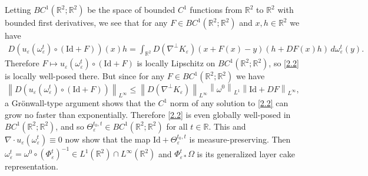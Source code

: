 \documentclass[reqno,centertags,12pt]{amsart}
\theoremstyle{definition}
\numberwithin{equation}{section}
\newcommand{\norm}[1]{\left\|#1\right\|}
\newcommand{\bbR}{{\mathbb{R}}}
\newcommand{\eps}{\varepsilon}
\begin{document}
Letting $BC^{1}(\bbR^{2};\bbR^{2})$ be the space of bounded $C^{1}$ functions from $\bbR^{2}$ to $\bbR^{2}$ with bounded first derivatives, we see that for any $F\in BC^{1}(\bbR^{2};\bbR^{2})$ and $x,h\in\bbR^{2}$ we have
\begin{align*}
    D(u_{\eps}(\omega_{\eps}^{t})\circ(\mathrm{Id} + F))(x)h
    = \int_{\bbR^{2}}D(\nabla^{\perp}K_{\eps})(x + F(x) - y)(h + DF(x)h)
    \,d\omega_{\eps}^{t}(y).
\end{align*}
Therefore
$F\mapsto u_{\eps}(\omega_{\eps}^{t})\circ(\mathrm{Id} + F)$
is locally Lipschitz on $BC^{1}(\bbR^{2};\bbR^{2})$, so
\eqref{2.2} is locally well-posed there.
But since for any $F\in BC^{1}(\bbR^{2};\bbR^{2})$ we have
\[
    \norm{D(u_{\eps}(\omega_{\eps}^{t})\circ(\mathrm{Id} + F))}_{L^{\infty}}
    \leq \norm{D(\nabla^{\perp}K_{\eps})}_{L^{\infty}}\norm{\omega^{0}}_{L^{1}}
    \norm{\mathrm{Id} + DF}_{L^{\infty}},
\]
a Gr\"{o}nwall-type argument shows that the $C^{1}$ norm of any solution to \eqref{2.2}
can grow no faster than exponentially.  Therefore \eqref{2.2} is even globally well-posed in
$BC^{1}(\bbR^{2};\bbR^{2})$, and so $\Theta_{\eps}^{t_{0},t}\in BC^{1}(\bbR^{2};\bbR^{2})$
for all $t\in\bbR$.  This and $\nabla \cdot u_{\eps}(\omega_{\eps}^{t}) \equiv 0$
now show that the map $\mathrm{Id} + \Theta_{\eps}^{t_{0},t}$ is measure-preserving.
Then $\omega_{\eps}^{t}=\omega^{0}\circ(\Phi_{\eps}^{t})^{-1}\in L^1(\bbR^2)\cap L^\infty(\bbR^2)$
and  $\Phi_{\eps*}^{t}\Omega$ is its generalized layer cake representation.
\end{document}
